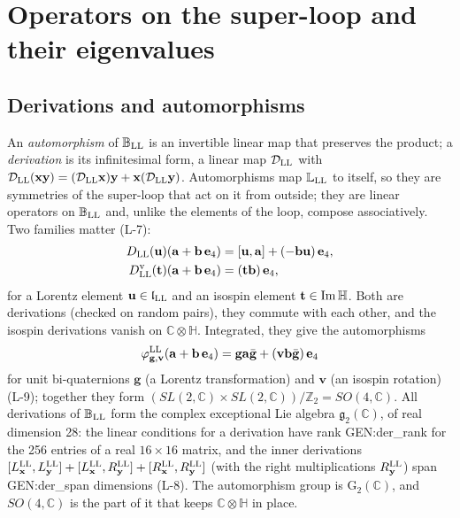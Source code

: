 \section{Operators on the super-loop and their eigenvalues}
\label{sec:operators}

\subsection{Derivations and automorphisms}

An \emph{automorphism} of $\mathbb B_{\rm LL}$ is an invertible linear map that preserves the product;
a \emph{derivation} is its infinitesimal form, a linear map $\mathcal D_{\rm LL}$ with
$\mathcal D_{\rm LL}(\mathbf x\mathbf y)=(\mathcal D_{\rm LL}\mathbf x)\mathbf y+\mathbf x(\mathcal
D_{\rm LL}\mathbf y)$. Automorphisms map $\mathbb L_{\rm LL}$ to itself, so they are
symmetries of the super-loop that act on it from outside; they are linear operators on
$\mathbb B_{\rm LL}$ and, unlike the elements of the loop, compose associatively. Two families
matter (L-7):
\begin{align}
D_{\rm LL}(\mathbf u)(\mathbf a+\mathbf b\,\mathbf e_4)&=[\mathbf u,\mathbf a]+(-\mathbf b\mathbf u)\,\mathbf e_4,\label{eq:dlor}\\
D^{\rm v}_{\rm LL}(\mathbf t)(\mathbf a+\mathbf b\,\mathbf e_4)&=(\mathbf t\mathbf b)\,\mathbf e_4,\label{eq:diso}
\end{align}
for a Lorentz element $\mathbf u\in\mathfrak l_{\rm LL}$ and an isospin element $\mathbf t\in{\rm
Im}\,\mathbb H$. Both are derivations (checked on random pairs), they commute with each other, and
the isospin derivations vanish on $\mathbb C\otimes\mathbb H$. Integrated, they give the automorphisms
\begin{equation}
\varphi^{\rm LL}_{\mathbf g,\mathbf v}(\mathbf a+\mathbf b\,\mathbf e_4)=\mathbf g\mathbf a\bar{\mathbf g}+(\mathbf v\mathbf b\bar{\mathbf g})\,\mathbf e_4
\label{eq:aut}
\end{equation}
for unit bi-quaternions $\mathbf g$ (a Lorentz transformation) and $\mathbf v$ (an isospin rotation)
(L-9); together they form $(SL(2,\mathbb C)\times SL(2,\mathbb C))/\mathbb Z_2=SO(4,\mathbb C)$.
All derivations of $\mathbb B_{\rm LL}$ form the complex exceptional Lie algebra $\mathfrak g_2(\mathbb
C)$, of real dimension 28: the linear conditions for a derivation have rank {{GEN:der_rank}} for the 256
entries of a real $16\times16$ matrix, and the inner derivations $[L^{\rm LL}_{\mathbf x},L^{\rm
LL}_{\mathbf y}]+[L^{\rm LL}_{\mathbf x},R^{\rm LL}_{\mathbf y}]+[R^{\rm LL}_{\mathbf x},R^{\rm
LL}_{\mathbf y}]$ (with the right multiplications $R^{\rm LL}_{\mathbf y}$) span {{GEN:der_span}}
dimensions (L-8). The automorphism group is $\mathrm G_2(\mathbb C)$, and $SO(4,\mathbb C)$ is the part
of it that keeps $\mathbb C\otimes\mathbb H$ in place.

